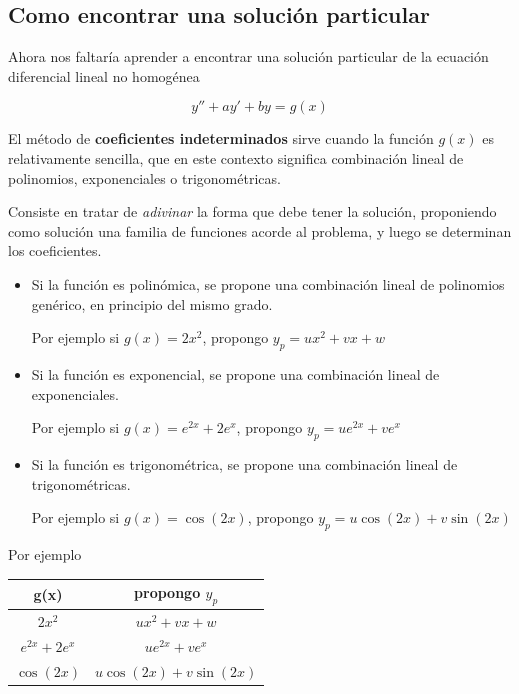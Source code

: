 \subsection{Como encontrar una solución particular}

Ahora nos faltaría aprender a encontrar una solución particular de la ecuación diferencial lineal no homogénea

$$ y'' + ay' + by = g(x) $$

El método de \textbf{coeficientes indeterminados} sirve cuando la función $g(x)$ es relativamente sencilla, que en este contexto significa combinación lineal de polinomios, exponenciales o trigonométricas.

Consiste en tratar de \emph{adivinar} la forma que debe tener la solución, proponiendo como solución una familia de funciones acorde al problema, y luego se determinan los coeficientes.

\begin{itemize}
\item Si la función es polinómica, se propone una combinación lineal de polinomios genérico, en principio del mismo grado.

Por ejemplo si $g(x) = 2x^2$, propongo $y_p = ux^2 + vx + w$

\item Si la función es exponencial, se propone una combinación lineal de exponenciales.  

Por ejemplo si $g(x) = e^{2x} + 2e^x$, propongo $y_p = ue^{2x} + ve^x$

\item Si la función es trigonométrica, se propone una combinación lineal de trigonométricas.

Por ejemplo si $g(x) = \cos(2x)$,  propongo $y_p = u\cos(2x) + v\sin(2x)$

\end{itemize}

Por ejemplo

\begin{center}
\begin{tabular}{|c|c|}
  \hline
  g(x) & propongo $y_p$ \\
  \hline
  $2x^2$ & $ux^2 + vx + w$ \\
  $e^{2x} + 2e^x$ & $ue^{2x} + ve^x$ \\
  $\cos(2x)$ & $u\cos(2x) + v\sin(2x)$ \\
  \hline
\end{tabular}
\end{center}

